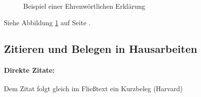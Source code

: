 \documentclass[ 12pt,
                titlepage,
                parskip=half,
                version=first,
                bibliography=totocnumbered,
                final,
                listof=totoc]{scrartcl}
\begin{document}
\begin{figure}[ht]
\centering
{}
\caption{Beispiel einer Ehrenwörtlichen Erklärung}
\label{img:ehrenwoertliche_erklaerung}
\end{figure}

Siehe Abbildung \ref{img:ehrenwoertliche_erklaerung} auf Seite
\pageref{img:ehrenwoertliche_erklaerung}.

\subsection{Zitieren und Belegen in Hausarbeiten}

\paragraph{Direkte Zitate:}
Dem Zitat folgt gleich im Fließtext ein Kurzbeleg (Harvard)
\end{document}
